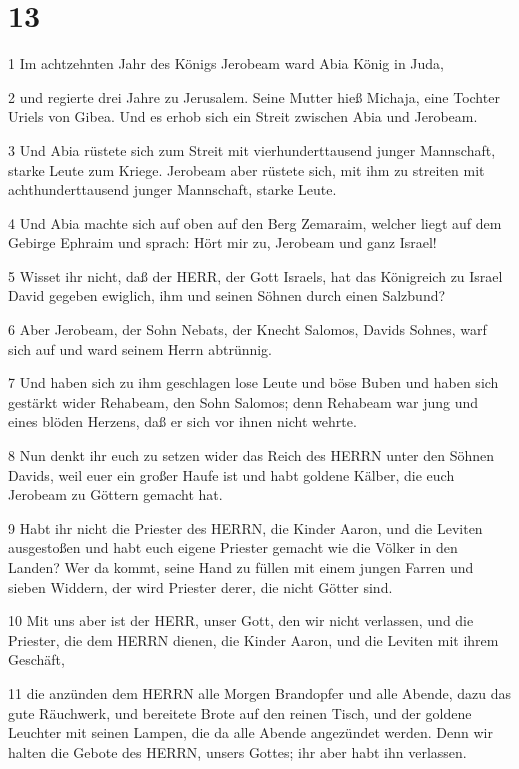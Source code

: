 \chapter{13}

\par 1 Im achtzehnten Jahr des Königs Jerobeam ward Abia König in Juda,
\par 2 und regierte drei Jahre zu Jerusalem. Seine Mutter hieß Michaja, eine Tochter Uriels von Gibea. Und es erhob sich ein Streit zwischen Abia und Jerobeam.
\par 3 Und Abia rüstete sich zum Streit mit vierhunderttausend junger Mannschaft, starke Leute zum Kriege. Jerobeam aber rüstete sich, mit ihm zu streiten mit achthunderttausend junger Mannschaft, starke Leute.
\par 4 Und Abia machte sich auf oben auf den Berg Zemaraim, welcher liegt auf dem Gebirge Ephraim und sprach: Hört mir zu, Jerobeam und ganz Israel!
\par 5 Wisset ihr nicht, daß der HERR, der Gott Israels, hat das Königreich zu Israel David gegeben ewiglich, ihm und seinen Söhnen durch einen Salzbund?
\par 6 Aber Jerobeam, der Sohn Nebats, der Knecht Salomos, Davids Sohnes, warf sich auf und ward seinem Herrn abtrünnig.
\par 7 Und haben sich zu ihm geschlagen lose Leute und böse Buben und haben sich gestärkt wider Rehabeam, den Sohn Salomos; denn Rehabeam war jung und eines blöden Herzens, daß er sich vor ihnen nicht wehrte.
\par 8 Nun denkt ihr euch zu setzen wider das Reich des HERRN unter den Söhnen Davids, weil euer ein großer Haufe ist und habt goldene Kälber, die euch Jerobeam zu Göttern gemacht hat.
\par 9 Habt ihr nicht die Priester des HERRN, die Kinder Aaron, und die Leviten ausgestoßen und habt euch eigene Priester gemacht wie die Völker in den Landen? Wer da kommt, seine Hand zu füllen mit einem jungen Farren und sieben Widdern, der wird Priester derer, die nicht Götter sind.
\par 10 Mit uns aber ist der HERR, unser Gott, den wir nicht verlassen, und die Priester, die dem HERRN dienen, die Kinder Aaron, und die Leviten mit ihrem Geschäft,
\par 11 die anzünden dem HERRN alle Morgen Brandopfer und alle Abende, dazu das gute Räuchwerk, und bereitete Brote auf den reinen Tisch, und der goldene Leuchter mit seinen Lampen, die da alle Abende angezündet werden. Denn wir halten die Gebote des HERRN, unsers Gottes; ihr aber habt ihn verlassen.

